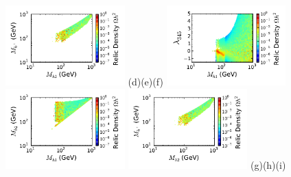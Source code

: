 \begin{figure}[htb]
{\hspace*{-1.77cm}\includegraphics[width=0.41\textwidth]{Figures/Mhc_Mh2_Omega_large-cut123456.pdf}}%
\vskip -1.1cm
\hspace*{1.2cm}(d)\hspace*{0.35\textwidth}\hspace*{-1.3cm}(e)\hspace*{0.35\textwidth}\hspace*{-1.2cm}(f)
\vskip 0.0cm
{\hspace*{-0.3cm}\includegraphics[width=0.41\textwidth]{Figures/Mh1_ld345_Omega_large-cut1234567.pdf}}%
{\hspace*{-1.78cm}\includegraphics[width=0.41\textwidth]{Figures/Mh1_Mh2_Omega_large-cut1234567.pdf}}%
{\hspace*{-1.77cm}\includegraphics[width=0.41\textwidth]{Figures/Mhc_Mh2_Omega_large-cut1234567.pdf}}%
\vskip -1.05cm
\hspace*{1.2cm}(g)\hspace*{0.35\textwidth}\hspace*{-1.3cm}(h)\hspace*{0.35\textwidth}\hspace*{-1.2cm}(i)

\end{figure}
